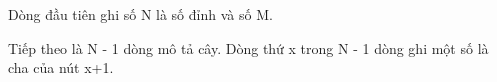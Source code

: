 Dòng đầu tiên ghi số N là số đỉnh và số M.

Tiếp theo là N - 1 dòng mô tả cây. Dòng thứ x trong N - 1 dòng ghi một số là cha của nút x+1.